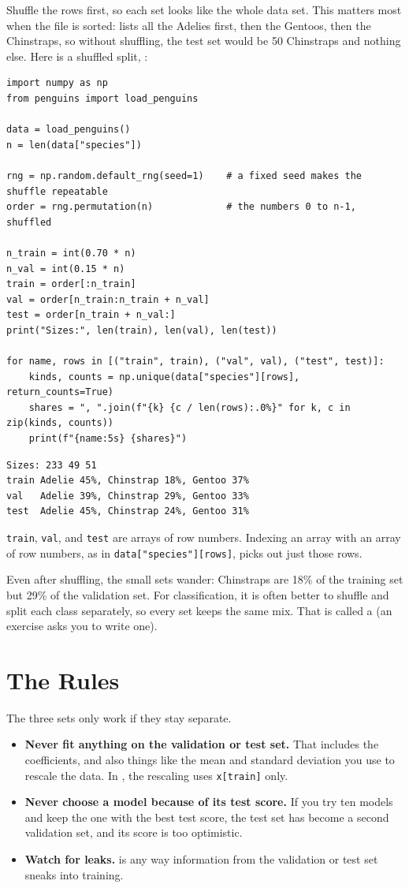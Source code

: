 Shuffle the rows first, so each set looks like the whole data set. This matters most when the file is sorted:
 lists all the Adelies first, then the Gentoos, then the Chinstraps, so without shuffling,
the test set would be 50 Chinstraps and nothing else. Here is a shuffled split, :

\begin{verbatim}
import numpy as np
from penguins import load_penguins

data = load_penguins()
n = len(data["species"])

rng = np.random.default_rng(seed=1)    # a fixed seed makes the shuffle repeatable
order = rng.permutation(n)             # the numbers 0 to n-1, shuffled

n_train = int(0.70 * n)
n_val = int(0.15 * n)
train = order[:n_train]
val = order[n_train:n_train + n_val]
test = order[n_train + n_val:]
print("Sizes:", len(train), len(val), len(test))

for name, rows in [("train", train), ("val", val), ("test", test)]:
    kinds, counts = np.unique(data["species"][rows], return_counts=True)
    shares = ", ".join(f"{k} {c / len(rows):.0%}" for k, c in zip(kinds, counts))
    print(f"{name:5s} {shares}")
\end{verbatim}

\begin{verbatim}
Sizes: 233 49 51
train Adelie 45%, Chinstrap 18%, Gentoo 37%
val   Adelie 39%, Chinstrap 29%, Gentoo 33%
test  Adelie 45%, Chinstrap 24%, Gentoo 31%
\end{verbatim}

\verb|train|, \verb|val|, and \verb|test| are arrays of row numbers. Indexing an array with an array of row
numbers, as in \verb|data["species"][rows]|, picks out just those rows.

Even after shuffling, the small sets wander: Chinstraps are 18\% of the training set but 29\% of the
validation set. For classification, it is often better to shuffle and split each class separately, so every
set keeps the same mix. That is called a  (an exercise asks
you to write one).

\section{The Rules}
The three sets only work if they stay separate.
\begin{itemize}
\item \textbf{Never fit anything on the validation or test set.} That includes the coefficients, and also
things like the mean and standard deviation you use to rescale the data. In , the
rescaling uses \verb|x[train]| only.
\item \textbf{Never choose a model because of its test score.} If you try ten models and keep the one with the
best test score, the test set has become a second validation set, and its score is too optimistic.
\item \textbf{Watch for leaks.}  is any way information from the
validation or test set sneaks into training.
\end{itemize}

